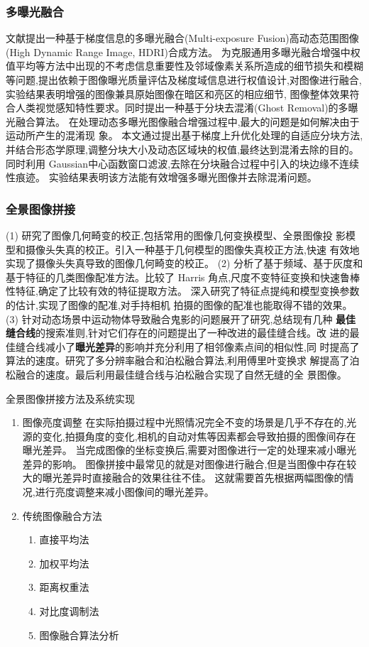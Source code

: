 \documentclass{amsart}
\begin{document}
\subsubsection{多曝光融合}
\label{sec:0203}

文献\cite{李艳梅}提出一种基于梯度信息的多曝光融合(Multi-exposure Fusion)高动态范围图像(High Dynamic Range Image, HDRI)合成方法。
为克服通用多曝光融合增强中权值平均等方法中出现的不考虑信息重要性及邻域像素关系所造成的细节损失和模糊等问题,提出依赖于图像曝光质量评估及梯度域信息进行权值设计,对图像进行融合,实验结果表明增强的图像兼具原始图像在暗区和亮区的相应细节,
图像整体效果符合人类视觉感知特性要求。同时提出一种基于分块去混淆(Ghost Removal)的多曝光融合算法。
在处理动态多曝光图像融合增强过程中,最大的问题是如何解决由于运动所产生的混淆现
象。
本文通过提出基于梯度上升优化处理的自适应分块方法,并结合形态学原理,调整分块大小及动态区域块的权值,最终达到混淆去除的目的。
同时利用 Gaussian中心函数窗口滤波,去除在分块融合过程中引入的块边缘不连续性痕迹。
实验结果表明该方法能有效增强多曝光图像并去除混淆问题。

\subsubsection{全景图像拼接}
\label{sec:0204}
\cite{赵书睿}
(1) 研究了图像几何畸变的校正,包括常用的图像几何变换模型、全景图像投
影模型和摄像头失真的校正。引入一种基于几何模型的图像失真校正方法,快速
有效地实现了摄像头失真导致的图像几何畸变的校正。
(2) 分析了基于频域、基于灰度和基于特征的几类图像配准方法。比较了 Harris
角点,尺度不变特征变换和快速鲁棒性特征,确定了比较有效的特征提取方法。
深入研究了特征点提纯和模型变换参数的估计,实现了图像的配准,对手持相机
拍摄的图像的配准也能取得不错的效果。
(3) 针对动态场景中运动物体导致融合鬼影的问题展开了研究,总结现有几种
\textbf{最佳缝合线}的搜索准则,针对它们存在的问题提出了一种改进的最佳缝合线。改
进的最佳缝合线减小了\textbf{曝光差异}的影响并充分利用了相邻像素点间的相似性,同
时提高了算法的速度。研究了多分辨率融合和泊松融合算法,利用傅里叶变换求
解提高了泊松融合的速度。最后利用最佳缝合线与泊松融合实现了自然无缝的全
景图像。

全景图像拼接方法及系统实现
\begin{enumerate}
\item 图像亮度调整
在实际拍摄过程中光照情况完全不变的场景是几乎不存在的,光源的变化,拍摄角度的变化,相机的自动对焦等因素都会导致拍摄的图像间存在曝光差异。
当完成图像的坐标变换后,需要对图像进行一定的处理来减小曝光差异的影响。
图像拼接中最常见的就是对图像进行融合,但是当图像中存在较大的曝光差异时直接融合的效果往往不佳。
这就需要首先根据两幅图像的情况,进行亮度调整来减小图像间的曝光差异。
\item 传统图像融合方法
  \begin{enumerate}
  \item 直接平均法
  \item 加权平均法
  \item 距离权重法
  \item 对比度调制法
  \item 图像融合算法分析
  \end{enumerate}
\end{enumerate}
\end{document}
